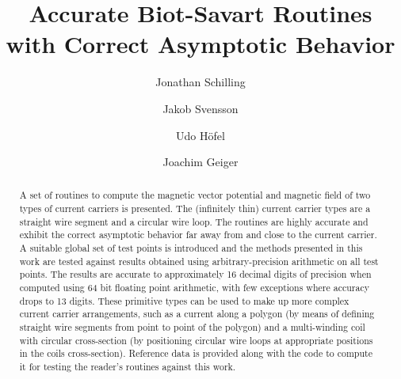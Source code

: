 \documentclass[preprint,12pt]{elsarticle}
\begin{document}
\begin{frontmatter}



\title{Accurate Biot-Savart Routines with Correct Asymptotic Behavior}


\author[a]{Jonathan Schilling}
\author[a]{Jakob Svensson}
\author[a]{Udo Höfel}
\author[a]{Joachim Geiger}

\address[a]{Max-Planck-Institute for Plasma Physics, Wendelsteinstrasse 1, 17489 Greifswald, Germany}

\begin{abstract}
A set of routines to compute the magnetic vector potential and magnetic field of two types of current carriers is presented.
The (infinitely thin) current carrier types are a straight wire segment and a circular wire loop.
The routines are highly accurate and exhibit the correct asymptotic behavior far away from and close to the current carrier.
A suitable global set of test points is introduced and the methods presented in this work
are tested against results obtained using arbitrary-precision arithmetic on all test points.
The results are accurate to approximately 16 decimal digits of precision when computed using 64 bit floating point arithmetic,
with few exceptions where accuracy drops to 13 digits.
These primitive types can be used to make up more complex current carrier arrangements,
such as a current along a polygon (by means of defining straight wire segments from point to point of the polygon)
and a multi-winding coil with circular cross-section (by positioning circular wire loops at appropriate positions in the coils cross-section).
Reference data is provided along with the code to compute it
for testing the reader's routines against this work.
\end{abstract}


\end{frontmatter}
\end{document}

